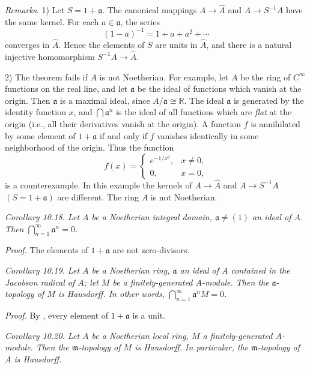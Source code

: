 \noindent\textit{Remarks.} 1) Let $S=1+\mathfrak a$. The canonical mappings $A\longrightarrow\widehat A$ and $A\longrightarrow S^{-1}A$ have the same kernel. For each $a\in\mathfrak a$, the series
\[
(1-a)^{-1}=1+a+a^2+\cdots
\]
converges in $\widehat A$. Hence the elements of $S$ are units in $\widehat A$, and there is a natural injective homomorphism $S^{-1}A\longrightarrow\widehat A$.

2) The theorem fails if $A$ is not Noetherian. For example, let $A$ be the ring of $C^{\infty}$ functions on the real line, and let $\mathfrak a$ be the ideal of functions which vanish at the origin. Then $\mathfrak a$ is a maximal ideal, since $A/\mathfrak a\cong\mathbb R$. The ideal $\mathfrak a$ is generated by the identity function $x$, and $\bigcap\mathfrak a^n$ is the ideal of all functions which are \textit{flat} at the origin (i.e., all their derivatives vanish at the origin). A function $f$ is annihilated by some element of $1+\mathfrak a$ if and only if $f$ vanishes identically in some neighborhood of the origin. Thus the function
\[
f(x)=\begin{cases}e^{-1/x^2},&x\neq0,\\0,&x=0,\end{cases}
\]
is a counterexample. In this example the kernels of $A\longrightarrow\widehat A$ and $A\longrightarrow S^{-1}A$ $(S=1+\mathfrak a)$ are different. The ring $A$ is not Noetherian.

\noindent\textit{Corollary 10.18. Let $A$ be a Noetherian integral domain, $\mathfrak a\neq(1)$ an ideal of $A$. Then $\bigcap_{n=1}^{\infty}\mathfrak a^n=0$.}

\noindent\textit{Proof.} The elements of $1+\mathfrak a$ are not zero-divisors. \proofbox

\noindent\textit{Corollary 10.19. Let $A$ be a Noetherian ring, $\mathfrak a$ an ideal of $A$ contained in the Jacobson radical of $A$; let $M$ be a finitely-generated $A$-module. Then the $\mathfrak a$-topology of $M$ is Hausdorff. In other words, $\bigcap_{n=1}^{\infty}\mathfrak a^nM=0$.}

\noindent\textit{Proof.} By , every element of $1+\mathfrak a$ is a unit. \proofbox

\noindent\textit{Corollary 10.20. Let $A$ be a Noetherian local ring, $M$ a finitely-generated $A$-module. Then the $\mathfrak m$-topology of $M$ is Hausdorff. In particular, the $\mathfrak m$-topology of $A$ is Hausdorff.} \proofbox

